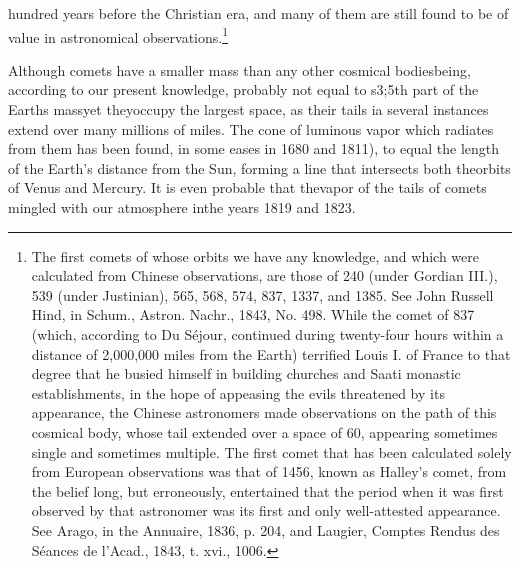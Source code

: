hundred years before the Christian era, and many of them are still found to be of value in astronomical observations.\footnote{The first comets of whose orbits we have any knowledge, and which were calculated from Chinese observations, are those of 240 (under Gordian III.), 539 (under Justinian), 565, 568, 574, 837, 1337, and 1385. See John Russell Hind, in Schum., Astron. Nachr., 1843, No. 498. While the comet of 837 (which, according to Du S\'{e}jour, continued during twenty-four hours within a distance of 2,000,000 miles from the Earth) terrified Louis I. of France to that degree that he busied himself in building churches and Saati monastic establishments, in the hope of appeasing the evils threatened by its appearance, the Chinese astronomers made observations on the path of this cosmical body, whose tail extended over a space of 60, appearing sometimes single and sometimes multiple. The first comet that has been calculated solely from European observations was that of 1456, known as Halley's comet, from the belief long, but erroneously, entertained that the period when it was first observed by that astronomer was its first and only well-attested appearance. See Arago, in the Annuaire, 1836, p. 204, and Laugier, Comptes Rendus des S\'{e}ances de l'Acad., 1843, t. xvi., 1006.}

Although comets have a smaller mass than any other cosmical bodiesbeing, according to our present knowledge, probably not equal to s3;5th part of the Earths massyet theyoccupy the largest space, as their tails ia several instances extend over many millions of miles. The cone of luminous vapor which radiates from them has been found, in some eases in 1680 and 1811), to equal the length of the Earth's distance from the Sun, forming a line that intersects both theorbits of Venus and Mercury. It is even probable that thevapor of the tails of comets mingled with our atmosphere inthe years 1819 and 1823.

